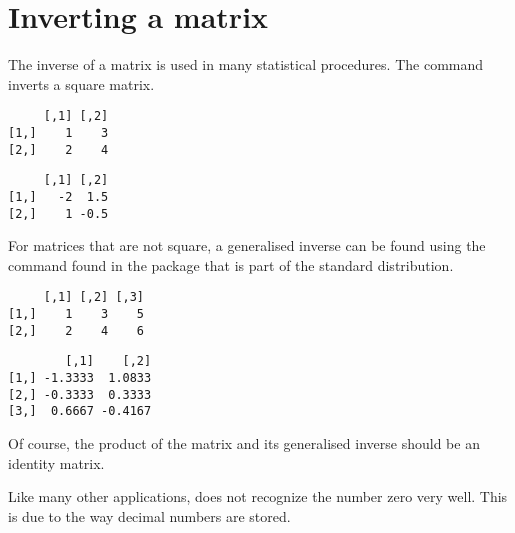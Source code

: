\section{Inverting a matrix} 
 
The inverse of a matrix is used in many statistical procedures. The  command inverts a square matrix. 
\begin{knitrout}
\color{fgcolor}\begin{kframe}
\begin{alltt}
\hlstd{> }
\end{alltt}
\begin{verbatim}
     [,1] [,2]
[1,]    1    3
[2,]    2    4
\end{verbatim}
\begin{alltt}
\hlstd{> }
\end{alltt}
\begin{verbatim}
     [,1] [,2]
[1,]   -2  1.5
[2,]    1 -0.5
\end{verbatim}
\end{kframe}
\end{knitrout}
 
For matrices that are not square, a generalised inverse can be found using the  command found in the  package that is part of the standard \R{} distribution. 
\begin{knitrout}
\color{fgcolor}\begin{kframe}
\begin{alltt}
\hlstd{> }
\end{alltt}
\begin{verbatim}
     [,1] [,2] [,3]
[1,]    1    3    5
[2,]    2    4    6
\end{verbatim}
\begin{alltt}
\hlstd{> }
\hlstd{> }
\end{alltt}
\begin{verbatim}
        [,1]    [,2]
[1,] -1.3333  1.0833
[2,] -0.3333  0.3333
[3,]  0.6667 -0.4167
\end{verbatim}
\end{kframe}
\end{knitrout}
Of course, the product of the matrix and its generalised inverse should be an identity matrix.  
\begin{knitrout}
\color{fgcolor}
\end{knitrout}
Like many other applications, \R{} does not recognize the number zero very well. This is due to the way decimal numbers are stored. 
 
